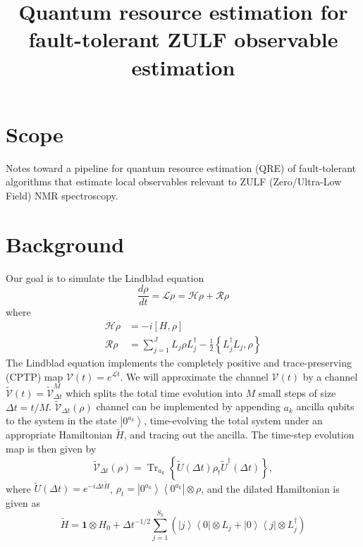\documentclass[11pt]{article}
\title{Quantum resource estimation for fault-tolerant ZULF observable estimation}
\author{}
\date{}
\newcommand{\calV}{\mathcal{V}}
\newcommand{\Dt}{\Delta t}
\newcommand{\calH}{\mathcal{H}}
\newcommand{\calR}{\mathcal{R}}
\newcommand{\calL}{\mathcal{L}}
\newcommand{\Ht}{\tilde{H}}
\newcommand{\rhot}{\rho_t}
\renewcommand{\ket}[1]{\left| #1 \right\rangle}
\renewcommand{\bra}[1]{\left\langle #1 \right|}
\DeclareMathOperator{\Tr}{Tr}
\begin{document}
\maketitle

\section{Scope}

Notes toward a pipeline for quantum resource estimation (QRE) of
fault-tolerant algorithms that estimate local observables relevant to
ZULF (Zero/Ultra-Low Field) NMR spectroscopy.

\section{Background}
Our goal is to simulate the Lindblad equation
\begin{equation}
    \frac{d\rho}{dt} = \calL \rho = \calH \rho + \calR\rho
\end{equation}
where
\begin{align}
    \calH \rho &= -i\left[H,\rho\right]\\
    \calR \rho &= \sum_{j=1}^J L_j \rho L_j^\dagger -\frac{1}{2}\left\{L_j^\dagger L_j,\rho\right\}\label{eq:relaxation} 
\end{align}
The Lindblad equation implements the completely positive and trace-preserving (CPTP) map $\calV\left(t\right)=e^{\calL t}$. 
We will approximate the channel $\calV\left(t\right)$ by a channel
$\tilde{\calV}\left(t\right)=\tilde{\calV}^M_{\Dt}$ which splits the 
total time evolution into $M$ small steps of size $\Dt=t/M$.
$\tilde{\calV}_{\Dt}\left(\rho\right)$ channel can be implemented by appending $a_k$ ancilla 
qubits to the system in the state $\ket{0^{a_k}}$, time-evolving the
total system under an appropriate Hamiltonian $\tilde{H}$, and tracing out the ancilla.
The time-step evolution map is then given by
\begin{equation}
    \tilde{\calV}_{\Dt}\left(\rho\right) = \Tr_{a_k}\left\{\tilde{U}\left(\Dt\right)\rhot \tilde{U}^\dagger\left(\Dt\right)\right\},
\end{equation}
where $\tilde{U}\left(\Dt\right)=e^{-i\Dt \Ht}$, $\rhot=\ket{0^{a_k}}\bra{0^{a_k}}\otimes\rho$, and the dilated Hamiltonian is given as
\begin{equation}
    \Ht = \mathbf{1} \otimes H_0 + \Dt^{-1/2}\sum_{j=1}^{S_k}\left(\ket{j}\bra{0}\otimes L_j + \ket{0}\bra{j}\otimes L_j^\dagger\right)
\end{equation}
\end{document}

